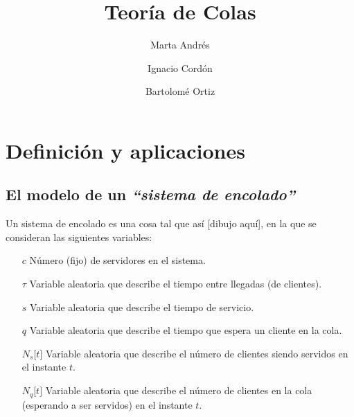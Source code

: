 \documentclass[a4paper,10pt]{scrartcl}
\title{Teoría de Colas}
\author{
  Marta Andrés\and
  Ignacio Cordón\and
  Bartolomé Ortiz\and
}
\date{}
\numberwithin{equation}{section}
\begin{document}
\maketitle
\tableofcontents
\pagebreak
\section{Definición y aplicaciones}


\subsection{El modelo de un \textit{``sistema de encolado''}}
Un sistema de encolado es una cosa tal que así [dibujo aquí], en la que se consideran las siguientes variables:


\begin{itemize}
\item [$c$]
  Número (fijo) de servidores en el sistema.
\item [$\tau$]
  Variable aleatoria que describe el tiempo entre llegadas (de clientes).
\item [$s$]
  Variable aleatoria que describe el tiempo de servicio.
\item [$q$]
  Variable aleatoria que describe el tiempo que espera un cliente en la cola.
\item [$N_s \lbrack t \rbrack$]
  Variable aleatoria que describe el número de clientes siendo servidos en el instante $t$.
\item [$N_q \lbrack t \rbrack$]
  Variable aleatoria que describe el número de clientes en la cola (esperando a ser servidos) en el instante $t$.
\end{itemize}

\end{document}

